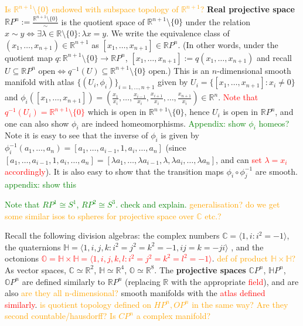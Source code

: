 \documentclass[a4paper]{article}
\theoremstyle{definition} \newtheorem*{definition}{Definition}
\theoremstyle{definition} \newtheorem*{definitions}{Definitions}
\theoremstyle{plain} \newtheorem{theorem}{Theorem}[section]
\theoremstyle{plain} \newtheorem{proposition}[theorem]{Proposition}
\theoremstyle{plain} \newtheorem{corollary}[theorem]{Corollary}
\theoremstyle{plain} \newtheorem{lemma}[theorem]{Lemma}
\theoremstyle{plain} \newtheorem{example}[theorem]{Example}
\newcommand{\checkCorrect}[1]{\textcolor{red}{#1}}
\newcommand{\question}[1]{\textcolor{orange}{#1}}
\newcommand{\finish}[1]{\textcolor{green}{#1}}
\newcommand{\defn}[1]{\textbf{#1}}
\newcommand{\realnos}{\mathbb{R}}
\newcommand{\complexnos}{\mathbb{C}}
\begin{document}
\question{Is $\realnos^{n+1}\setminus \{0\}$ endowed with subspace topology of $\realnos^{n+1}$?}
\defn{Real projective space} $\realnos P^n := \frac{\realnos^{n+1}\setminus \{0\}}{\sim}$ is the quotient space of $\realnos^{n+1}\setminus \{0\}$ under the relation $x\sim y \iff \exists \lambda \in \realnos \setminus \{0\} : \lambda x=y$. We write the equivalence class of $(x_1, \ldots, x_{n+1})\in \realnos^{n+1}$ as $[x_1, \ldots, x_{n+1}]\in \realnos P^n$. (In other words, under the quotient map $q:\realnos^{n+1}\setminus \{0\}\to \realnos P^n$, $[x_1, \ldots, x_{n+1}]:=q(x_1, \ldots, x_{n+1})$ and recall $U \subseteq \realnos P^n \textrm{ open} \iff q^{-1}(U) \subseteq \realnos^{n+1}\setminus \{0\} \textrm{ open}$.) This is an $n$-dimensional smooth manifold with atlas $\{(U_i, \phi_i)\}_{i=1, \ldots, n+1}$ given by $U_i=\{[x_1, \ldots, x_{n+1}]: x_i\neq 0\}$ and $\phi_i([x_1, \ldots, x_{n+1}])=(\frac{x_1}{x_i}, \ldots , \frac{x_{i-1}}{x_i}, \frac{x_{i+1}}{x_i}, \ldots, \frac{x_{n+1}}{x_i})\in \realnos^n$. \checkCorrect{Note that $q^{-1}(U_i)=\realnos^{n+1}\setminus \{0\}$} which is open in $\realnos^{n+1}\setminus \{0\}$, hence $U_i$ is open in $\realnos P^n$, and one can also show $\phi_i$ are indeed homeomorphisms. \finish{Appendix: show $\phi_i$ homeos?} Note it is easy to see that the inverse of $\phi_i$ is given by $\phi_i^{-1}(a_1, \ldots, a_n)=[a_1, \ldots, a_{i-1}, 1, a_{i}, \ldots, a_n]$ (since $[a_1, \ldots, a_{i-1}, 1, a_{i}, \ldots, a_n]=[\lambda a_1, \ldots, \lambda a_{i-1}, \lambda, \lambda a_{i}, \ldots, \lambda a_n]$, and can \checkCorrect{set $\lambda=x_i$ accordingly}). It is also easy to show that the transition maps $\phi_i\circ \phi_j^{-1}$ are smooth. \finish{appendix: show this}

\finish{Note that $RP^1 \cong S^1$, $RP^2\cong S^3$. check and explain.} \question{generalisation? do we get some similar isos to spheres for projective space over $\complexnos$ etc.?}

 Recall the following division algebras: the complex numbers $\complexnos = \langle 1, i: i^2=-1 \rangle$, the quaternions $\mathbb{H} = \langle 1, i, j, k: i^2=j^2=k^2=-1, ij=k=-ji \rangle$ , and the octonions \checkCorrect{$\mathbb{O} = \mathbb{H}\times \mathbb{H}=\langle 1, i, j, k, l: i^2=j^2=k^2=l^2=-1 \rangle$}. \question{def of product $\mathbb{H}\times \mathbb{H}$?} As vector spaces, $\complexnos \simeq \realnos^2$, $\mathbb{H} \simeq \realnos^4$, $\mathbb{O} \simeq \realnos^8$. The \defn{projective spaces} $\complexnos P^n$, $\mathbb{H} P^n$, $\mathbb{O} P^n$ are defined similarly to $\realnos P^n$ (replacing $\realnos$ with the appropriate \checkCorrect{field}), and are also \question{are they all n-dimensional?} smooth manifolds with the \checkCorrect{atlas defined similarly}.
\question{is quotient topology defined on $HP^n, OP^n$ in the same way? Are they second countable/hausdorff?}
\question{Is $CP^n$ a complex manifold?}
\end{document}
